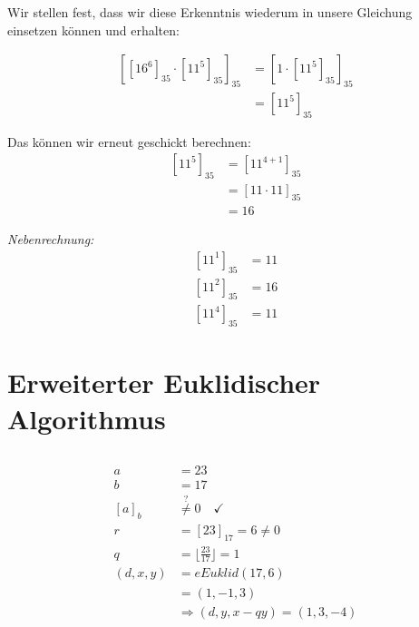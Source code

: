\documentclass{../crypto}
\begin{document}
Wir stellen fest, dass wir diese Erkenntnis wiederum in unsere Gleichung 
einsetzen können und erhalten:

\begin{align*}
  \left[ \left[16^6\right]_{35} \cdot \left[11^5\right]_{35} \right]_{35} & = \left[1 \cdot \left[11^5\right]_{35} \right]_{35} \\
                                                                          & = \left[11^5\right]_{35}
\end{align*}

Das können wir erneut geschickt berechnen:
\begin{align*}
  \left[11^{5}\right]_{35}  & = \left[11^{4+1}\right]_{35}    \\
                            & = \left[11 \cdot 11\right]_{35} \\
                            & = 16
\end{align*}
  
\emph{Nebenrechnung:}
\begin{align*}
  \left[11^{1}\right]_{35} &= 11 \\
  \left[11^{2}\right]_{35} &= 16 \\
  \left[11^{4}\right]_{35} &= 11
\end{align*}


\section{Erweiterter Euklidischer Algorithmus}

\subsection{}

\begin{align*}
  a          & = 23                                                \\
  b          & = 17                                                \\
  [a]_b      & \stackrel{?}{\neq} 0 \quad \checkmark               \\
  r          & =                 [23]_{17} = 6 \neq 0              \\
  q          & =                 \lfloor \frac{23}{17} \rfloor = 1 \\
  (d, x, y)  & =                 \textit{$eEuklid$}(17, 6)         \\
             & =                 (1, -1, 3)                        \\
             & \Rightarrow       (d, y, x - qy) = (1, 3, -4)
\end{align*}
\end{document}
